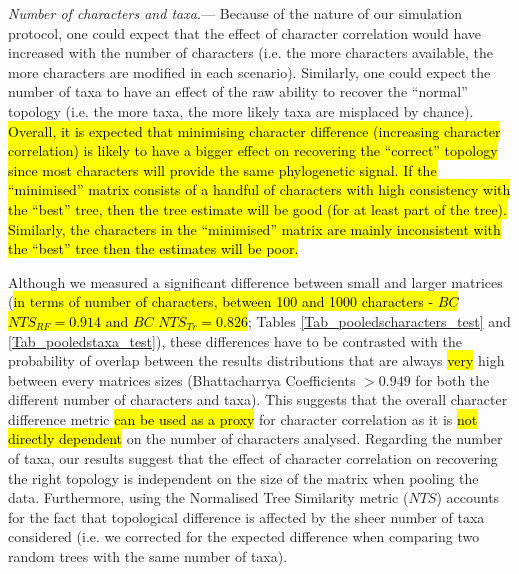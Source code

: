 \documentclass[12pt,letterpaper]{article}
\renewcommand{\subsubsection}[1]{%
\vspace{2ex}
\noindent
\textit{#1.}---}
\begin{document}
\subsubsection{Number of characters and taxa}
Because of the nature of our simulation protocol, one could expect that the effect of character correlation would have increased with the number of characters (i.e. the more characters available, the more characters are modified in each scenario).
Similarly, one could expect the number of taxa to have an effect of the raw ability to recover the ``normal'' topology (i.e. the more taxa, the more likely taxa are misplaced by chance).
\hl{Overall, it is expected that minimising character difference (increasing character correlation) is likely to have a bigger effect on recovering the ``correct'' topology since most characters will provide the same phylogenetic signal.
If the ``minimised'' matrix consists of a handful of characters with high consistency with the ``best'' tree, then the tree estimate will be good (for at least part of the tree).
Similarly, the characters in the ``minimised'' matrix are mainly inconsistent with the ``best'' tree then the estimates will be poor.}

Although we measured a significant difference between small and larger matrices (\hl{in terms of number of characters, between 100 and 1000 characters - $BC$ $NTS_{RF}=0.914$ and $BC$ $NTS_{Tr}=0.826$}; Tables \ref{Tab_pooledscharacters_test} and \ref{Tab_pooledstaxa_test}),
these differences have to be contrasted with the probability of overlap between the results distributions that are always \hl{very} high between every matrices sizes (Bhattacharrya Coefficients $>0.949$ for both the different number of characters and taxa).
This suggests that the overall character difference metric \hl{can be used as a proxy} for character correlation as it is \hl{not directly dependent} on the number of characters analysed.
Regarding the number of taxa, our results suggest that the effect of character correlation on recovering the right topology is independent on the size of the matrix when pooling the data.
Furthermore, using the Normalised Tree Similarity metric ($NTS$) accounts for the fact that topological difference is affected by the sheer number of taxa considered (i.e. we corrected for the expected difference when comparing two random trees with the same number of taxa).
\end{document}
